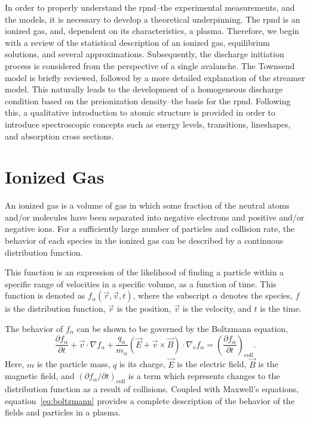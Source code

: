 In order to properly understand the \acs{rpnd}--the experimental measurements,
and the models, it is necessary to develop a theoretical underpinning. The
\acs{rpnd} is an ionized gas, and, dependent on its characteristics, a plasma.
Therefore, we begin with a review of the statistical description of an ionized
gas, equilibrium solutions, and several approximations. Subsequently, the
discharge initiation process is considered from the perspective of a single
avalanche. The Townsend model is briefly reviewed, followed by a more detailed
explanation of the streamer model. This naturally leads to the development of a
homogeneous discharge condition based on the preionization density--the basis
for the \acs{rpnd}. Following this, a qualitative introduction to atomic
structure is provided in order to introduce spectroscopic concepts such as
energy levels, transitions, lineshapes, and absorption cross sections.

\section{Ionized Gas}
An ionized gas is a volume of gas in which some fraction of the neutral atoms
and/or molecules have been separated into negative electrons and positive and/or
negative ions. For a sufficiently large number of particles and collision rate,
the behavior of each species in the ionized gas can be described by a continuous
distribution function.

This function is an expression of the likelihood of finding a particle within a
specific range of velocities in a specific volume, as a function of time. This
function is denoted as $f_\alpha(\vec{r}, \vec{v}, t)$, where the subscript
$\alpha$ denotes the species, $f$ is the distribution function, $\vec{r}$ is the
position, $\vec{v}$ is the velocity, and $t$ is the time.

The behavior of $f_\alpha$ can be shown \cite{Bellan2008} to be governed by the
Boltzmann equation,
\begin{equation}\label{eq:boltzmann}
  \frac{\partial f_\alpha}{\partial t} + \vec{v}\cdot\nabla f_\alpha +
  \frac{q_\alpha}{m_\alpha} \left(\vec{E} + \vec{v}\times\vec{B}\right)
  \cdot \nabla_v f_\alpha = \left( \frac{\partial f_\alpha}
  {\partial t}\right)_\mathrm{coll}.
\end{equation}
Here, $m$ is the particle mass, $q$ is its charge, $\vec{E}$ is the electric
field, $\vec{B}$ is the magnetic field, and $(\partial f_\alpha/\partial
t)_\mathrm{coll}$ is a term which represents changes to the distribution
function as a result of collisions. Coupled with Maxwell's equations,
equation~\ref{eq:boltzmann} provides a complete description of the behavior of
the fields and particles in a plasma.


